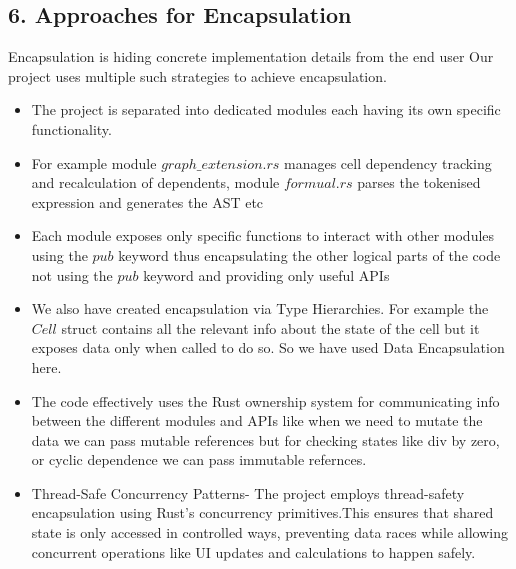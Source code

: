 \documentclass{article}
\begin{document}
\begin{itemize}
\section*{6. Approaches for Encapsulation}
Encapsulation is hiding concrete implementation details from the end user
Our project uses multiple such strategies to achieve encapsulation.
\begin{itemize}
    \item The project is separated into dedicated modules each having its own specific functionality.
    \item For example module $graph\_extension.rs$ manages cell dependency tracking and recalculation of dependents, module $formual.rs$ parses the tokenised expression and generates the AST etc
    \item Each module exposes only specific functions to interact with other modules using the $pub$ keyword thus encapsulating the other logical parts of the code not using the $pub$ keyword and providing only useful APIs
    \item We also have created encapsulation via Type Hierarchies. For example the $Cell$ struct contains all the relevant info about the state of the cell but it exposes data only when called to do so. So we have used Data Encapsulation here.
    \item The code effectively uses the Rust ownership system for communicating info between the different modules and APIs like when we need to mutate the data we can pass mutable references but for checking states like div by zero, or cyclic dependence we can pass immutable refernces.
    \item Thread-Safe Concurrency Patterns- The project employs thread-safety encapsulation using Rust's concurrency primitives.This ensures that shared state is only accessed in controlled ways, preventing data races while allowing concurrent operations like UI updates and calculations to happen safely.
\end{itemize}


\end{itemize}
\end{document}
